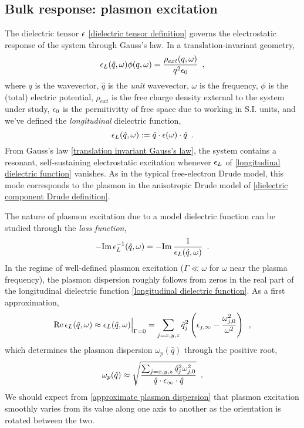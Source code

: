 \subsection{Bulk response: plasmon excitation}

The dielectric tensor $\epsilon$ \eqref{dielectric tensor definition} governs the electrostatic response of the system through Gauss's law.  In a translation-invariant geometry,
\begin{equation}
    \label{translation invariant Gauss's law}
    \epsilon_L(\hat q,\omega) \phi(q,\omega) = \frac{\rho_{ext}(q,\omega)}{q^2 \epsilon_0}\,\,\,,
\end{equation}
where $q$ is the wavevector, $\hat q$ is the {\it unit} wavevector, $\omega$ is the frequency, $\phi$ is the (total) electric potential, $\rho_{ext}$ is the free charge density external to the system under study, $\epsilon_0$ is the permitivitty of free space due to working in S.I. units, and we've defined the {\it longitudinal} dielectric function,
\begin{equation}
    \label{longitudinal dielectric function}
    \epsilon_L(\hat q,\omega) := \hat q\cdot \epsilon(\omega)\cdot \hat q\,\,\,.
\end{equation}
From Gauss's law \eqref{translation invariant Gauss's law}, the system contains a resonant, self-sustaining electrostatic excitation whenever $\epsilon_L$ of \eqref{longitudinal dielectric function} vanishes.  As in the typical free-electron Drude model, this mode corresponds to the plasmon in the anisotropic Drude model of \eqref{dielectric component Drude definition}.

The nature of plasmon excitation due to a model dielectric function can be studied through the {\it loss function},
\begin{equation}
    \label{bulk loss function}
    -\text{Im}\, \epsilon^{-1}_L(\hat q,\omega) = -\text{Im}\,\frac{1}{\epsilon_L(\hat q,\omega)}
    \,\,\,.
\end{equation}
In the regime of well-defined plasmon excitation ($\Gamma \ll \omega$ for $\omega$ near the plasma frequency), the plasmon dispersion roughly follows from zeros in the real part of the longitudinal dielectric function \eqref{longitudinal dielectric function}.  As a first approximation,
\begin{equation}
    \label{real part of longitudinal dielectric function without damping}
    \text{Re}\,\epsilon_L(\hat q, \omega) \approx \epsilon_L(\hat q, \omega)\Big|_{\Gamma = 0}
    =
    \sum_{j=x,y,z} \hat q_j^2\left(\epsilon_{j,\infty} - \frac{\omega_{j,0}^2}{\omega^2}\right)
    \,\,\,,
\end{equation}
which determines the plasmon dispersion $\omega_p(\hat q)$ through the positive root,
\begin{equation}
    \label{approximate plasmon dispersion}
    \omega_p(\hat q) \approx 
    \sqrt{\frac{\sum_{j=x,y,z} \hat q_j^2 \omega_{j,0}^2}{\hat q \cdot \epsilon_{\infty} \cdot \hat q}}
    \,\,\,.
\end{equation}
We should expect from \eqref{approximate plasmon dispersion} that plasmon excitation smoothly varies from its value along one axis to another as the orientation is rotated between the two.

